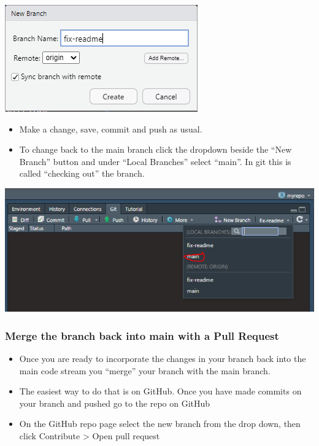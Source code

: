 \documentclass[
  letterpaper,
  DIV=11,
  numbers=noendperiod]{scrreprt}
\providecommand{\tightlist}{%
  \setlength{\itemsep}{0pt}\setlength{\parskip}{0pt}}\usepackage{longtable,booktabs,array}
\begin{document}
\includegraphics{assets/img/new_branch_name.png}

\begin{itemize}
\tightlist
\item
  Make a change, save, commit and push as usual.
\item
  To change back to the main branch click the dropdown beside the ``New
  Branch'' button and under ``Local Branches'' select ``main''. In git
  this is called ``checking out'' the branch.
\end{itemize}

\includegraphics{assets/img/change_branch.png}

\hypertarget{merge-the-branch-back-into-main-with-a-pull-request}{%
\subsubsection{Merge the branch back into main with a Pull
Request}\label{merge-the-branch-back-into-main-with-a-pull-request}}

\begin{itemize}
\tightlist
\item
  Once you are ready to incorporate the changes in your branch back into
  the main code stream you ``merge'' your branch with the main branch.
\item
  The easiest way to do that is on GitHub. Once you have made commits on
  your branch and pushed go to the repo on GitHub
\item
  On the GitHub repo page select the new branch from the drop down, then
  click Contribute \textgreater{} Open pull request
\end{itemize}
\end{document}

